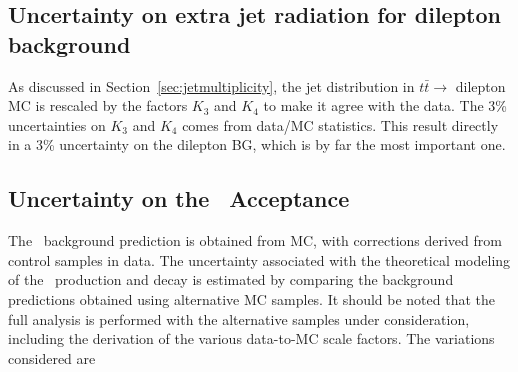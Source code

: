 \subsection{Uncertainty on extra jet radiation for dilepton
  background}
As discussed in Section~\ref{sec:jetmultiplicity}, the 
jet distribution in
$t\bar{t} \to$
dilepton MC is rescaled by the factors $K_3$ and $K_4$ to make 
it agree with the data.  The 3\% uncertainties on $K_3$ and $K_4$
comes from data/MC statistics.  This  
result directly in a 3\% uncertainty on the dilepton BG, which is by far 
the most important one.


\subsection{Uncertainty on the \ttll\ Acceptance}

The \ttbar\ background prediction is obtained from MC, with corrections
derived from control samples in data. The uncertainty associated with
the theoretical modeling of the \ttbar\ production and decay is
estimated by comparing the background predictions obtained using 
alternative MC samples. It should be noted that the full analysis is
performed with the alternative samples under consideration, 
including the derivation of the various data-to-MC scale factors. 
The variations considered are


